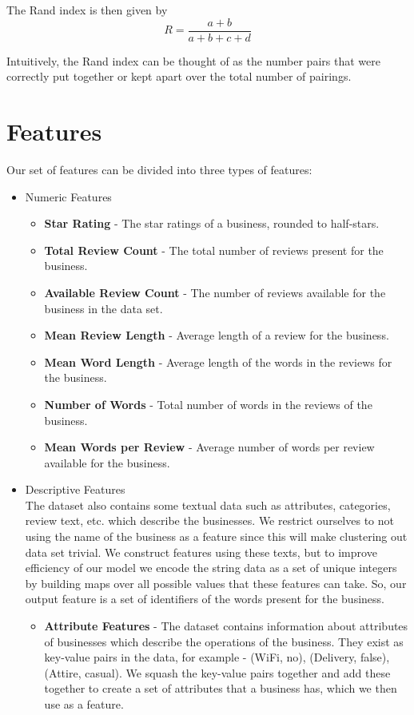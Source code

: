 \documentclass{article}
\begin{document}
      The Rand index is then given by
      $$ R = \frac{a + b}{a + b + c + d} $$

      Intuitively, the Rand index can be thought of as the number pairs that were correctly put together or kept apart over the total number of pairings.

\section{Features}
   Our set of features can be divided into three types of features:
   \begin{itemize}
      \item Numeric Features
         \begin{itemize}
            \item \textbf{Star Rating} - The star ratings of a business, rounded to half-stars.
            \item \textbf{Total Review Count} - The total number of reviews present for the business. 
               \item \textbf{Available Review Count} - The number of reviews available for the business in the data set.
               \item \textbf{Mean Review Length} - Average length of a review for the business.
               \item \textbf{Mean Word Length} - Average length of the words in the reviews for the business.
               \item \textbf{Number of Words} - Total number of words in the reviews of the business.
               \item \textbf{Mean Words per Review} - Average number of words per review available for the business.
         \end{itemize}

      \item Descriptive Features \\
         The dataset also contains some textual data such as attributes, categories, review text, etc. which describe the businesses.
         We restrict ourselves to not using the name of the business as a feature since this will make clustering out data set trivial.
         We construct features using these texts, but to improve efficiency of our model we encode the string data as a set of unique integers by building maps over all possible values that these features can take.
         So, our output feature is a set of identifiers of the words present for the business.
         \begin{itemize}
            \item
               \textbf{Attribute Features} - The dataset contains information about attributes of businesses which describe the operations of the business.
               They exist as key-value pairs in the data, for example - (WiFi, no), (Delivery, false), (Attire, casual).
               We squash the key-value pairs together and add these together to create a set of attributes that a business has, which we then use as a feature.


\end{itemize}
\end{itemize}
\end{document}
